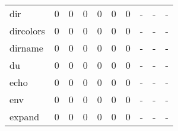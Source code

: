\begin{longtable}{lp{2.0cm}p{2.0cm}p{2.0cm}p{2.0cm}p{2.0cm}p{2.0cm}p{2.0cm}p{2.0cm}p{2.0cm}}
dir       &                      0 &                                             0 &                                            0 &                                           0 &                                            0 &                                          0 &                                    - &                                      - &                                    - \\
dircolors &                      0 &                                             0 &                                            0 &                                           0 &                                            0 &                                          0 &                                    - &                                      - &                                    - \\
dirname   &                      0 &                                             0 &                                            0 &                                           0 &                                            0 &                                          0 &                                    - &                                      - &                                    - \\
du        &                      0 &                                             0 &                                            0 &                                           0 &                                            0 &                                          0 &                                    - &                                      - &                                    - \\
echo      &                      0 &                                             0 &                                            0 &                                           0 &                                            0 &                                          0 &                                    - &                                      - &                                    - \\
env       &                      0 &                                             0 &                                            0 &                                           0 &                                            0 &                                          0 &                                    - &                                      - &                                    - \\
expand    &                      0 &                                             0 &                                            0 &                                           0 &                                            0 &                                          0 &                                    - &                                      - &                                    - \\

\end{longtable}
